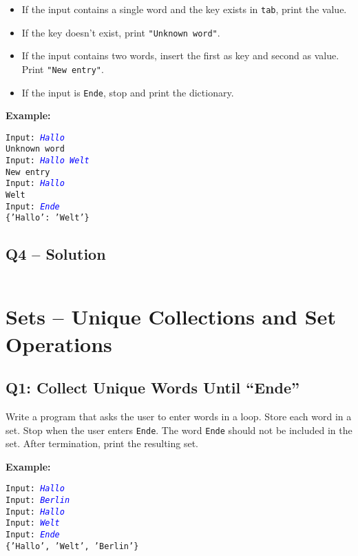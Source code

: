 \documentclass[a4paper,11pt]{article}
\begin{document}
	\begin{itemize}
		\item If the input contains a single word and the key exists in \texttt{tab}, print the value.
		\item If the key doesn’t exist, print \texttt{"Unknown word"}.
		\item If the input contains two words, insert the first as key and second as value. Print \texttt{"New entry"}.
		\item If the input is \texttt{Ende}, stop and print the dictionary.
	\end{itemize}
	
	\textbf{Example:}
	\begin{flushleft}
		\texttt{Input: \textcolor{blue}{\textit{Hallo}}}\\
		\texttt{Unknown word}\\
		\texttt{Input: \textcolor{blue}{\textit{Hallo Welt}}}\\
		\texttt{New entry}\\
		\texttt{Input: \textcolor{blue}{\textit{Hallo}}}\\
		\texttt{Welt}\\
		\texttt{Input: \textcolor{blue}{\textit{Ende}}}\\
		\texttt{\{'Hallo': 'Welt'\}}
	\end{flushleft}
	
\subsection*{Q4 – Solution}
\inputminted{python}{Files/8/4.py}
\newpage
\section{Sets – Unique Collections and Set Operations}

\subsection*{Q1: Collect Unique Words Until “Ende”}
Write a program that asks the user to enter words in a loop. Store each word in a set. Stop when the user enters \texttt{Ende}. The word \texttt{Ende} should not be included in the set. After termination, print the resulting set.

\textbf{Example:}
\begin{flushleft}
	\texttt{Input: \textcolor{blue}{\textit{Hallo}}}\\
	\texttt{Input: \textcolor{blue}{\textit{Berlin}}}\\
	\texttt{Input: \textcolor{blue}{\textit{Hallo}}}\\
	\texttt{Input: \textcolor{blue}{\textit{Welt}}}\\
	\texttt{Input: \textcolor{blue}{\textit{Ende}}}\\
	\texttt{\{'Hallo', 'Welt', 'Berlin'\}}
\end{flushleft}
\end{document}
